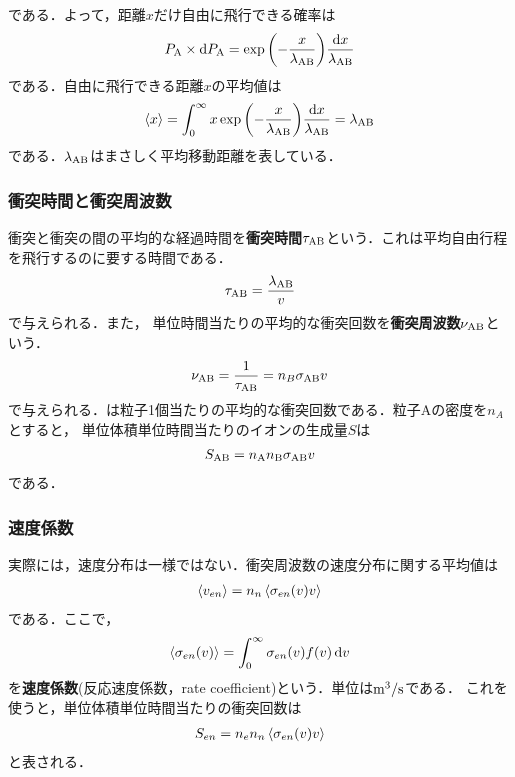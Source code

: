 \documentclass{report}
\begin{document}
        である．よって，距離$x$だけ自由に飛行できる確率は
        \begin{align}
          P_{\mathrm{A}}\times\dd{P_{\mathrm{A}}} = \exp\qty(-\frac{x}{\lambda_{\mathrm{AB}}})\frac{\dd{x}}{\lambda_{\mathrm{AB}}}
        \end{align}
        である．自由に飛行できる距離$x$の平均値は
        \begin{align}
          \ev{x} = \int_0^{\infty} x\exp\qty(-\frac{x}{\lambda_{\r{AB}}})\frac{\dd{x}}{\lambda_{\r{AB}}} = \lambda_{\r{AB}}
        \end{align}
        である．$\lambda_{\mathrm{AB}}$はまさしく平均移動距離を表している．
      \subsubsection{衝突時間と衝突周波数}
        衝突と衝突の間の平均的な経過時間を\textbf{衝突時間}$\tau_{\mathrm{AB}}$という．これは平均自由行程を飛行するのに要する時間である．
        \begin{align}
          \tau_{\mathrm{AB}} = \frac{\lambda_{\mathrm{AB}}}{v} \label{eq:collision_time}
        \end{align}
        で与えられる．また，
        単位時間当たりの平均的な衝突回数を\textbf{衝突周波数}$\nu_{\mathrm{AB}}$という．
        \begin{align}
          \nu_{\mathrm{AB}} = \frac{1}{\tau_{\mathrm{AB}}} = n_B \sigma_{\mathrm{AB}} v \label{eq:collision_frequency}
        \end{align}
        で与えられる．は粒子1個当たりの平均的な衝突回数である．粒子Aの密度を$n_A$とすると，
        単位体積単位時間当たりのイオンの生成量$S$は
        \begin{align}
          S_{\mathrm{AB}} = n_{\mathrm{A}} n_{\mathrm{B}} \sigma_{\mathrm{AB}} v
        \end{align}
        である．
      \subsubsection{速度係数}
        実際には，速度分布は一様ではない．衝突周波数の速度分布に関する平均値は
        \begin{align}
          \ev{v_{en}} = n_n \ev{\sigma_{en}(v)v}
        \end{align}
        である．ここで，
        \begin{align}
          \ev{\sigma_{en}(v)} = \int_0^{\infty} \sigma_{en}(v)f(v)\dd{v}
        \end{align}
        を\textbf{速度係数}(反応速度係数，rate coefficient)という．単位は$\mathrm{m^3/s}$である．
        これを使うと，単位体積単位時間当たりの衝突回数は
        \begin{align}
          S_{en} = n_e n_n \ev{\sigma_{en}(v)v}
        \end{align}
        と表される．
\end{document}
